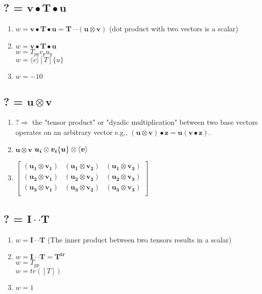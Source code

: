 \documentclass[10pt, letterpaper]{article}
\begin{document}
	\subsection{? = $\bm{v} \bullet \bm{T} \bullet \bm{u}$}
		\begin{enumerate}[label = (\roman*)]
			\item $w = \bm{v} \bullet \bm{T} \bullet \bm{u} = \bm{T} \cdot \cdot (\bm{u} \otimes \bm{v})$ 
				(dot product with two vectors is a scalar)
			\item $w = \bm{v} \bullet \bm{T} \bullet \bm{u}$ \\
				 $w = T_{pq} v_p u_q$\\				 			
				$w = \langle v \rangle [T] \{u\}$
			\item $w = -10$
		\end{enumerate}
		
	\subsection{? = $\bm{u} \otimes \bm{v}$}
		\begin{enumerate}[label = (\roman*)]
			\item $? \Rightarrow$ the "tensor product" or "dyadic multiplication" between two base vectors 
					operates on an arbitrary vector 
					e.g., $(\bm{u} \otimes \bm{v}) \bullet \bm{z} = \bm{u} (\bm{v} \bullet \bm{z})$.  
			\item	$\bm{u} \otimes \bm{v}$
				$\bm{u_i} \otimes \bm{v_i} \\
				\{\bm{u} \} \otimes \langle \bm{v} \rangle$
			\item $\begin{bmatrix*}
			 (\bm{u_1} \otimes \bm{v_1}) &  
			 (\bm{u_1} \otimes \bm{v_2}) & 
			 (\bm{u_1} \otimes \bm{v_3}) \\
			 (\bm{u_2} \otimes \bm{v_1}) &
			 (\bm{u_2} \otimes \bm{v_2}) &
			 (\bm{u_2} \otimes \bm{v_3})  \\
			 (\bm{u_3} \otimes \bm{v_1}) &
			 (\bm{u_3} \otimes \bm{v_2}) & 
			 (\bm{u_3} \otimes \bm{v_3}) \\
		 \end{bmatrix*} $
				
		\end{enumerate}	

	\subsection{? = $\bm{I} \cdot \cdot \bm{T}$}
		\begin{enumerate}[label = (\roman*)]
			\item $w = \bm{I} \cdot \cdot \bm{T}$ (The inner product between two tensors results in a scalar)
			\item $w = \bm{I} \cdot \cdot \bm{T} = \bm{T^{tr}}$\\
				 $w = T_{pp}$\\				 			
				$w = tr( [T] )$
			\item $w = 1$
		\end{enumerate}
			
\end{document}
